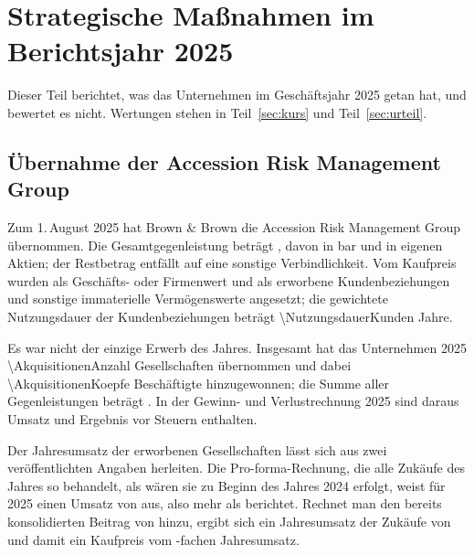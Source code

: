 \section{Strategische Ma{\ss}nahmen im Berichtsjahr 2025}

Dieser Teil berichtet, was das Unternehmen im Gesch\"aftsjahr 2025 getan
hat, und bewertet es nicht. Wertungen stehen in Teil~\ref{sec:kurs} und
Teil~\ref{sec:urteil}.

\subsection{\"Ubernahme der Accession Risk Management Group}
\label{sec:accession}

Zum 1.\,August 2025 hat Brown \& Brown die Accession Risk Management Group
\"ubernommen. Die Gesamtgegenleistung betr\"agt
\MioUSDexakt{\AccessionKaufpreis}, davon \MioUSDexakt{\AccessionBarzahlung}
in bar und \MioUSDexakt{\AccessionAktien} in eigenen Aktien; der
Restbetrag entf\"allt auf eine sonstige Verbindlichkeit. Vom Kaufpreis
wurden \MioUSDexakt{\AccessionGoodwill} als Gesch\"afts- oder Firmenwert und
\MioUSDexakt{\AccessionImmat} als erworbene Kundenbeziehungen und sonstige
immaterielle Verm\"ogenswerte angesetzt; die gewichtete Nutzungsdauer der
Kundenbeziehungen betr\"agt \num{\NutzungsdauerKunden}
Jahre.

Es war nicht der einzige Erwerb des Jahres. Insgesamt hat das Unternehmen
2025 \num{\AkquisitionenAnzahl} Gesellschaften \"ubernommen und dabei
\num{\AkquisitionenKoepfe} Besch\"aftigte hinzugewonnen;
die Summe aller Gegenleistungen betr\"agt
\MioUSDexakt{\KaeufeKaufpreis}. In der
Gewinn- und Verlustrechnung 2025 sind daraus
\MioUSDexakt{\UmsatzAusKaeufen} Umsatz und
\MioUSDexakt{\ErgebnisAusKaeufen} Ergebnis vor Steuern
enthalten.

Der Jahresumsatz der erworbenen Gesellschaften l\"asst sich aus zwei
ver\"offentlichten Angaben herleiten. Die Pro-forma-Rechnung, die alle
Zuk\"aufe des Jahres so behandelt, als w\"aren sie zu Beginn des Jahres 2024
erfolgt, weist f\"ur 2025 einen Umsatz von \MioUSDexakt{\ProFormaUmsatz}
aus, also \MioUSDexakt{\ProFormaMehrumsatz} mehr als
berichtet. Rechnet man den bereits
konsolidierten Beitrag von \MioUSDexakt{\UmsatzAusKaeufen} hinzu, ergibt
sich ein Jahresumsatz der Zuk\"aufe von
\MioUSDexakt{\ZukaeufeUmsatzJahr} und damit ein Kaufpreis vom
\Faktor{\KaufpreisJeUmsatz}-fachen Jahresumsatz.

